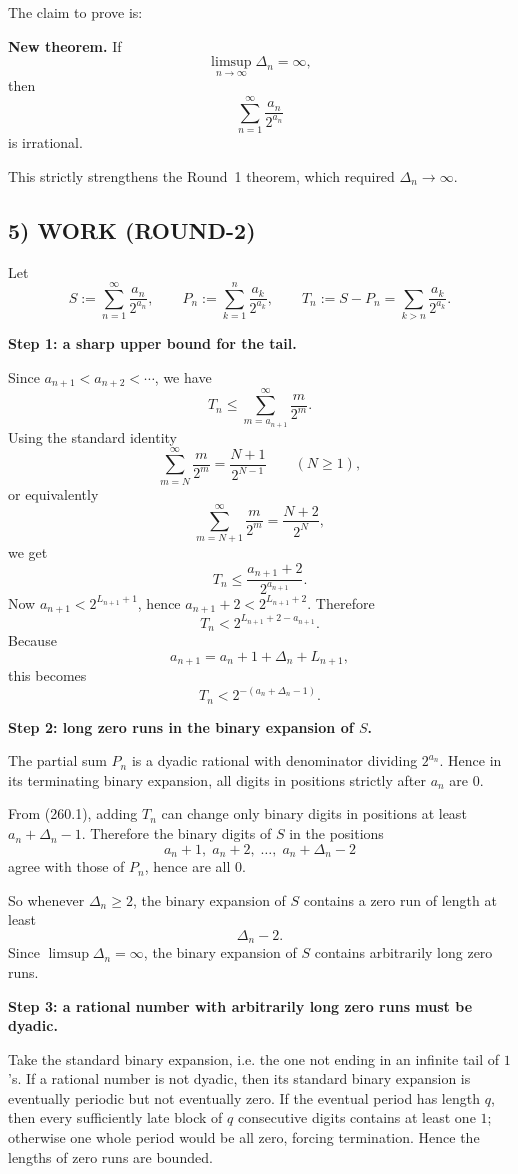 The claim to prove is:

\medskip
\noindent
\textbf{New theorem.}
If
\[
\limsup_{n\to\infty}\Delta_n=\infty,
\]
then
\[
\sum_{n=1}^{\infty}\frac{a_n}{2^{a_n}}
\]
is irrational.
\medskip

This strictly strengthens the Round~1 theorem, which required $\Delta_n\to\infty$.

\subsection*{5) WORK (ROUND-2)}

Let
\[
S:=\sum_{n=1}^{\infty}\frac{a_n}{2^{a_n}},\qquad
P_n:=\sum_{k=1}^{n}\frac{a_k}{2^{a_k}},\qquad
T_n:=S-P_n=\sum_{k>n}\frac{a_k}{2^{a_k}}.
\]

\medskip
\noindent
\textbf{Step 1: a sharp upper bound for the tail.}

Since $a_{n+1}<a_{n+2}<\cdots$, we have
\[
T_n\leq \sum_{m=a_{n+1}}^{\infty}\frac{m}{2^m}.
\]
Using the standard identity
\[
\sum_{m=N}^{\infty}\frac{m}{2^m}=\frac{N+1}{2^{N-1}}
\qquad (N\geq 1),
\]
or equivalently
\[
\sum_{m=N+1}^{\infty}\frac{m}{2^m}=\frac{N+2}{2^N},
\]
we get
\[
T_n\leq \frac{a_{n+1}+2}{2^{a_{n+1}}}.
\]
Now $a_{n+1}<2^{L_{n+1}+1}$, hence $a_{n+1}+2<2^{L_{n+1}+2}$.  Therefore
\[
T_n<2^{L_{n+1}+2-a_{n+1}}.
\]
Because
\[
a_{n+1}=a_n+1+\Delta_n+L_{n+1},
\]
this becomes
\[
T_n<2^{-(a_n+\Delta_n-1)}.
\tag{260.1}
\]

\medskip
\noindent
\textbf{Step 2: long zero runs in the binary expansion of $S$.}

The partial sum $P_n$ is a dyadic rational with denominator dividing $2^{a_n}$.  Hence in its terminating binary expansion, all digits in positions strictly after $a_n$ are $0$.

From (260.1), adding $T_n$ can change only binary digits in positions at least $a_n+\Delta_n-1$.  Therefore the binary digits of $S$ in the positions
\[
a_n+1,\; a_n+2,\; \dots,\; a_n+\Delta_n-2
\]
agree with those of $P_n$, hence are all $0$.

So whenever $\Delta_n\geq 2$, the binary expansion of $S$ contains a zero run of length at least
\[
\Delta_n-2.
\]
Since $\limsup \Delta_n=\infty$, the binary expansion of $S$ contains arbitrarily long zero runs.

\medskip
\noindent
\textbf{Step 3: a rational number with arbitrarily long zero runs must be dyadic.}

Take the standard binary expansion, i.e. the one not ending in an infinite tail of $1$'s.  If a rational number is not dyadic, then its standard binary expansion is eventually periodic but not eventually zero.  If the eventual period has length $q$, then every sufficiently late block of $q$ consecutive digits contains at least one $1$; otherwise one whole period would be all zero, forcing termination.  Hence the lengths of zero runs are bounded.

